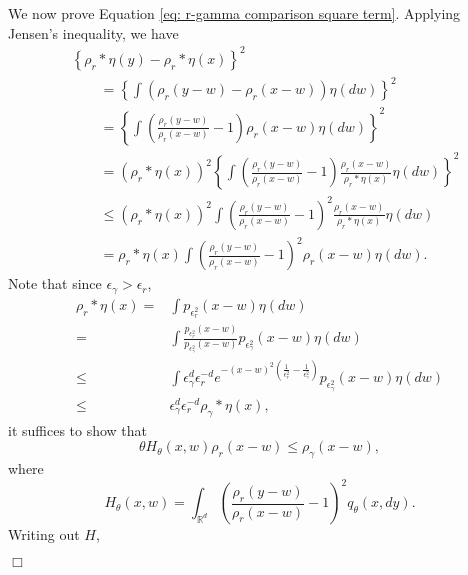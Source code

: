 \documentclass[12pt]{article}
\newenvironment {proof}{{\noindent\bf Proof }}{\hfill $\Box$ \medskip}
\begin{document}
\begin{proof}
We now prove Equation \eqref{eq: r-gamma comparison square term}. Applying Jensen's inequality, we have
\begin{align}
&\left\{
            \rho_r * \eta(y)
            -
            \rho_r * \eta(x)
\right\}^2  \\
&\qquad
=
\left\{
\int
    \left(
        \rho_r(y-w)
        -
        \rho_r(x-w)
    \right)
\eta(dw)
\right\}^2  \\
&\qquad
=
\left\{
\int
    \left(
        \frac{\rho_r(y-w)}{\rho_r(x-w)}
        -
        1
    \right)
    \rho_r(x-w)
\eta(dw)
\right\}^2  \\
&\qquad
=
\left(\rho_r * \eta(x)\right)^2 \left\{
\int
    \left(
        \frac{\rho_r(y-w)}{\rho_r(x-w)}
        -
        1
    \right)
    \frac{\rho_r(x-w)}{\rho_r * \eta(x)}
\eta(dw)
\right\}^2  \\
&\qquad
\le
\left(\rho_r * \eta(x)\right)^2 
\int
    \left(
        \frac{\rho_r(y-w)}{\rho_r(x-w)}
        -
        1
    \right)^2
    \frac{\rho_r(x-w)}{\rho_r * \eta(x)}
\eta(dw) \\
&\qquad
=
\rho_r * \eta(x)
\int
    \left(
        \frac{\rho_r(y-w)}{\rho_r(x-w)}
        -
        1
    \right)^2
    \rho_r(x-w)
\eta(dw).
\end{align}
Note that since $\epsilon_{\gamma}>\epsilon_{r}$,
\begin{equation}
    \label{eq: gamma-r convolution comparison}
\begin{aligned}
 \rho_r * \eta(x)=& \int p_{\epsilon^2_r}(x-w) \eta(dw)\\
                 =&  \int \frac{p_{\epsilon^2_r}(x-w)}{p_{\epsilon^2_\gamma}(x-w)}
                  p_{\epsilon^2_\gamma}(x-w) \eta(dw)\\
            \leq & \int \epsilon_\gamma^d \epsilon_r^{-d}
                   e^{-(x-w)^2(\frac{1}{\epsilon^2_r}-\frac{1}{\epsilon^2_\gamma})}
                   p_{\epsilon^2_\gamma}(x-w) \eta(dw)\\
            \leq & \epsilon_\gamma^d \epsilon_r^{-d}\rho_\gamma * \eta(x),
\end{aligned}
\end{equation}
it suffices to show that 
\begin{equation}
 \theta H_{\theta}(x,w)\rho_r(x-w)\leq \rho_{\gamma}(x-w),
\end{equation}
where
$$H_{\theta}(x,w)=\int_{\mathbb{R}^d}
    \left(
        \frac{\rho_r(y-w)}{\rho_r(x-w)}
        -
        1
    \right)^2
q_{\theta}(x,dy).$$
Writing out $H$,
\begin{align}

\end{align}
\end{proof}
\end{document}
